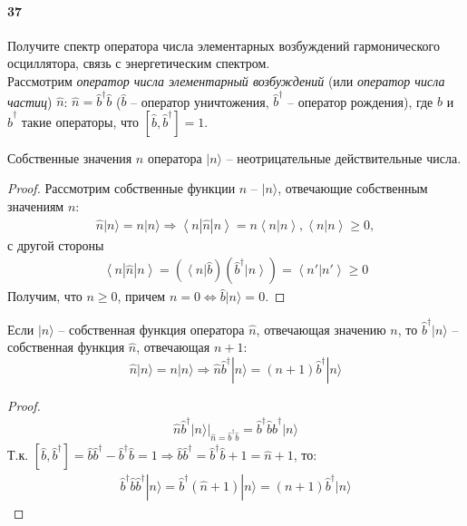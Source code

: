 



\paragraph{37}
Получите спектр оператора числа элементарных возбуждений гармонического осциллятора, связь с энергетическим спектром.\\

Рассмотрим \textit{оператор числа элементарный возбуждений} (или \textit{оператор числа частиц}) $\hat{n}$: $\hat{n} = \hat{b}^\dagger\hat{b}$ ($\hat{b}$ -- оператор уничтожения, $\hat{b}^\dagger$ -- оператор рождения), где $\hat{b}$ и $\hat{b}^\dagger$ такие операторы, что $[\hat{b},\hat{b}^\dagger]=1$.

\begin{theorem}
Собственные значения $n$ оператора $|n\rangle$ -- неотрицательные действительные числа.
\end{theorem}
\begin{proof}
Рассмотрим собственные функции $\hat{n}$ -- $|n\rangle$, отвечающие собственным значениям $n$:
\begin{gather*}
\hat{n}|n\rangle = n|n\rangle
\Longrightarrow
\left< n| \hat{n}|n\right> = n \left<n|n\right>, \left<n|n\right> \ge 0,
\end{gather*}
с другой стороны
\begin{gather*}
\left< n| \hat{n}|n\right> = (\left< n\right|\hat{b})(\hat{b}^\dagger\left|n\right>) =
\left< n'|n'\right> \ge 0
\end{gather*}
Получим, что $n\ge 0$, причем $n=0\Leftrightarrow \hat{b}|n\rangle = 0$.
\end{proof}
\begin{theorem}
Если $|n\rangle$ -- собственная функция оператора $\hat{n}$, отвечающая значению $n$, то $\hat{b}^\dagger|n\rangle$ -- собственная функция $\hat{n}$, отвечающая $n+1$:
$$
\hat{n}|n\rangle=n|n\rangle\Longrightarrow\hat{n}\hat{b}^\dagger|n\rangle=(n+1)\hat{b}^\dagger|n\rangle
$$
\end{theorem}
\begin{proof}
\begin{gather*}
\hat{n}\hat{b}^\dagger|n\rangle
|_{\hat{n}=\hat{b}^\dagger\hat{b}}
=
\hat{b}^\dagger\hat{b}\hat{b}^\dagger|n\rangle
\end{gather*}
Т.к. $[\hat{b},\hat{b}^\dagger]=\hat{b}\hat{b}^\dagger-\hat{b}^\dagger\hat{b}=1\Longrightarrow\hat{b}\hat{b}^\dagger=\hat{b}^\dagger\hat{b}+1=\hat{n}+1$, то:
\begin{gather*}
\hat{b}^\dagger\hat{b}\hat{b}^\dagger|n\rangle
=
\hat{b}^\dagger(\hat{n}+1)|n\rangle
=
(n+1)\hat{b}^\dagger|n\rangle
\end{gather*}
\end{proof}
